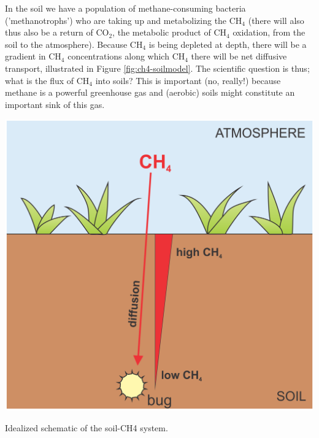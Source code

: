 \documentclass{tufte-book} %
\begin{document}
In the soil we have a population of methane-consuming bacteria ('methanotrophs') who are taking up and metabolizing the CH\(_{4}\) (there will also thus also be a return of CO\(_{2}\), the metabolic product of CH\(_{4}\) oxidation, from the soil to the atmosphere). Because CH\(_{4}\) is being depleted at depth, there will be a gradient in CH\(_{4}\) concentrations along which CH\(_{4}\) there will be net diffusive transport, illustrated in Figure \ref{fig:ch4-soilmodel}. The scientific question is thus; what is the flux of CH\(_{4}\) into  soils? This is important (no, really!) because methane is a powerful greenhouse gas and (aerobic) soils might constitute an important sink of this gas.

\begin{marginfigure}[-5.0in]
\includegraphics[width=\linewidth]{ch4-soilmodel.png}
\caption{Idealized schematic of the soil-CH4 system.}
\label{fig:ch4-soilmodel}
\end{marginfigure}
\end{document}
